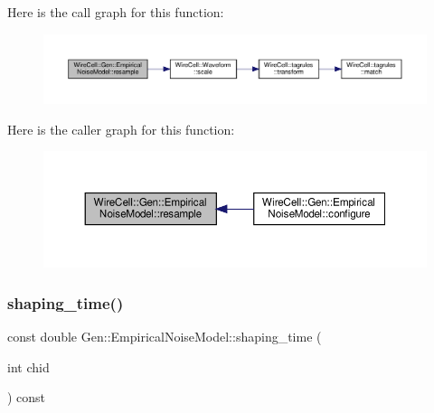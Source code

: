 Here is the call graph for this function\+:
\nopagebreak
\begin{figure}[H]
\begin{center}
\leavevmode
\includegraphics[width=350pt]{class_wire_cell_1_1_gen_1_1_empirical_noise_model_a35db0e36d1426041740535fc2da0b07d_cgraph}
\end{center}
\end{figure}
Here is the caller graph for this function\+:
\nopagebreak
\begin{figure}[H]
\begin{center}
\leavevmode
\includegraphics[width=350pt]{class_wire_cell_1_1_gen_1_1_empirical_noise_model_a35db0e36d1426041740535fc2da0b07d_icgraph}
\end{center}
\end{figure}
\mbox{\label{class_wire_cell_1_1_gen_1_1_empirical_noise_model_ada27f0991c188eb877a6702bb0878805}} 
\subsubsection{\texorpdfstring{shaping\+\_\+time()}{shaping\_time()}}
{\footnotesize\ttfamily const double Gen\+::\+Empirical\+Noise\+Model\+::shaping\+\_\+time (\begin{DoxyParamCaption}\item[{int}]{chid }\end{DoxyParamCaption}) const\hspace{0.3cm}{\ttfamily [virtual]}}



